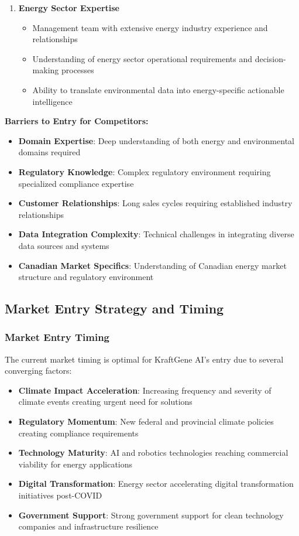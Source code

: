 \begin{enumerate}
    \item \textbf{Energy Sector Expertise}
    \begin{itemize}
        \item Management team with extensive energy industry experience and relationships
        \item Understanding of energy sector operational requirements and decision-making processes
        \item Ability to translate environmental data into energy-specific actionable intelligence
    \end{itemize}
\end{enumerate}

\textbf{Barriers to Entry for Competitors:}

\begin{itemize}
    \item \textbf{Domain Expertise}: Deep understanding of both energy and environmental domains required
    \item \textbf{Regulatory Knowledge}: Complex regulatory environment requiring specialized compliance expertise
    \item \textbf{Customer Relationships}: Long sales cycles requiring established industry relationships
    \item \textbf{Data Integration Complexity}: Technical challenges in integrating diverse data sources and systems
    \item \textbf{Canadian Market Specifics}: Understanding of Canadian energy market structure and regulatory environment
\end{itemize}

\subsection{Market Entry Strategy and Timing}

\subsubsection{Market Entry Timing}

The current market timing is optimal for KraftGene AI's entry due to several converging factors:

\begin{itemize}
    \item \textbf{Climate Impact Acceleration}: Increasing frequency and severity of climate events creating urgent need for solutions
    \item \textbf{Regulatory Momentum}: New federal and provincial climate policies creating compliance requirements
    \item \textbf{Technology Maturity}: AI and robotics technologies reaching commercial viability for energy applications
    \item \textbf{Digital Transformation}: Energy sector accelerating digital transformation initiatives post-COVID
    \item \textbf{Government Support}: Strong government support for clean technology companies and infrastructure resilience
\end{itemize}

